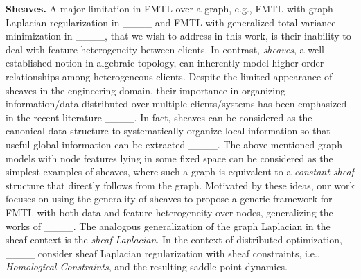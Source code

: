 \textbf{Sheaves.}
A major limitation in FMTL over a graph, e.g., FMTL with graph Laplacian regularization in ____ and FMTL with generalized total variance minimization in ____, that we wish to address in this work, is their inability to deal with feature heterogeneity between clients. In contrast, \textit{sheaves}, a well-established notion in algebraic topology, can inherently model higher-order relationships among heterogeneous clients. Despite the limited appearance of sheaves in the engineering domain, their importance in organizing information/data distributed over multiple clients/systems has been emphasized in the recent literature ____. In fact, sheaves can be considered as the canonical data structure to systematically organize local information so that useful global information can be extracted ____. The above-mentioned graph models with node features lying in some fixed space can be considered as the simplest examples of sheaves, where such a graph is equivalent to a \textit{constant sheaf} structure that directly follows from the graph. Motivated by these ideas, our work focuses on using the generality of sheaves to propose a generic framework for FMTL with both data and feature heterogeneity over nodes, generalizing the works of ____. The analogous generalization of the graph Laplacian in the sheaf context is the \textit{sheaf Laplacian}. In the context of distributed optimization, ____ consider sheaf Laplacian regularization with sheaf constraints, i.e., \textit{Homological Constraints}, and the resulting saddle-point dynamics.